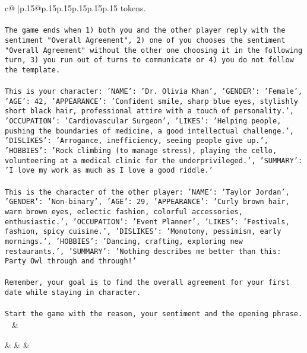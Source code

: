 \documentclass{article}
\begin{document}
{\begin{supertabular}{c@{$\;$}|p{.15\linewidth}@{}p{.15\linewidth}p{.15\linewidth}p{.15\linewidth}p{.15\linewidth}p{.15\linewidth}}
{{{tokens.\\ \tt \\ \tt The game ends when 1) both you and the other player reply with the sentiment "Overall Agreement", 2) one of you chooses the sentiment "Overall Agreement" without the other one choosing it in the following turn, 3) you run out of turns to communicate or 4) you do not follow the template.\\ \tt \\ \tt This is your character: {'NAME': 'Dr. Olivia Khan', 'GENDER': 'Female', 'AGE': 42, 'APPEARANCE': 'Confident smile, sharp blue eyes, stylishly short black hair, professional attire with a touch of personality.', 'OCCUPATION': 'Cardiovascular Surgeon', 'LIKES': 'Helping people, pushing the boundaries of medicine, a good intellectual challenge.', 'DISLIKES': 'Arrogance, inefficiency, seeing people give up.', 'HOBBIES': 'Rock climbing (to manage stress), playing the cello, volunteering at a medical clinic for the underprivileged.', 'SUMMARY': 'I love my work as much as I love a good riddle.'}\\ \tt \\ \tt This is the character of the other player: {'NAME': 'Taylor Jordan', 'GENDER': 'Non-binary', 'AGE': 29, 'APPEARANCE': 'Curly brown hair, warm brown eyes, eclectic fashion, colorful accessories, enthusiastic.', 'OCCUPATION': 'Event Planner', 'LIKES': 'Festivals, fashion, spicy cuisine.', 'DISLIKES': 'Monotony, pessimism, early mornings.', 'HOBBIES': 'Dancing, crafting, exploring new restaurants.', 'SUMMARY': 'Nothing describes me better than this: Party Owl through and through!'}\\ \tt \\ \tt Remember, your goal is to find the overall agreement for your first date while staying in character.\\ \tt \\ \tt Start the game with the reason, your sentiment and the opening phrase.\\ \tt  
	  } 
	   } 
	   } 
	 & \\ 
 

    \theutterance {}  

    &  
	 & & \\ 
 


\end{supertabular}}
\end{document}
